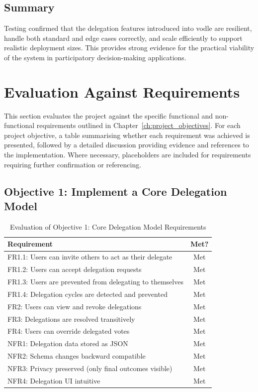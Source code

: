\subsection*{Summary}
Testing confirmed that the delegation features introduced into vodle are resilient, handle both standard and edge cases correctly, and scale efficiently to support realistic deployment sizes. This provides strong evidence for the practical viability of the system in participatory decision-making applications.


\section{Evaluation Against Requirements}

This section evaluates the project against the specific functional and non-functional requirements outlined in Chapter~\ref{ch:project_objectives}. For each project objective, a table summarising whether each requirement was achieved is presented, followed by a detailed discussion providing evidence and references to the implementation. Where necessary, placeholders are included for requirements requiring further confirmation or referencing.

\subsection{Objective 1: Implement a Core Delegation Model}

\begin{table}[H]
\centering
\begin{tabular}{|p{9cm}|c|}
\hline
\textbf{Requirement} & \textbf{Met?} \\ \hline
FR1.1: Users can invite others to act as their delegate & Met \\ \hline
FR1.2: Users can accept delegation requests & Met \\ \hline
FR1.3: Users are prevented from delegating to themselves & Met \\ \hline
FR1.4: Delegation cycles are detected and prevented & Met \\ \hline
FR2: Users can view and revoke delegations & Met \\ \hline
FR3: Delegations are resolved transitively & Met \\ \hline
FR4: Users can override delegated votes & Met \\ \hline
NFR1: Delegation data stored as JSON & Met \\ \hline
NFR2: Schema changes backward compatible & Met \\ \hline
NFR3: Privacy preserved (only final outcomes visible) & Met \\ \hline
NFR4: Delegation UI intuitive & Met \\ \hline
\end{tabular}
\caption{Evaluation of Objective 1: Core Delegation Model Requirements}
\label{tab:objective1_requirements}
\end{table}

